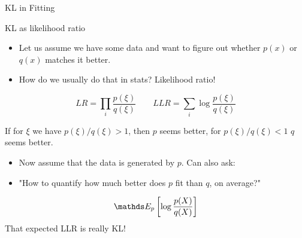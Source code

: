 \documentclass[11pt,compress,t,notes=noshow, xcolor=table]{beamer}
\begin{document}
\begin{vbframe} {KL in Fitting}
\framebreak



\end{vbframe}

\begin{vbframe}{KL as likelihood ratio}

\begin{itemize}
\item Let us assume we have some data and want to figure out whether $p(x)$ or $q(x)$ matches it better.
\item How do we usually do that in stats? Likelihood ratio! 
\end{itemize}

$$ LR = \prod_i \frac{p(\xi)}{q(\xi)} \qquad LLR = \sum_i \log \frac{p(\xi)}{q(\xi)} $$
  
If for $\xi$ we have $p(\xi)/q(\xi)>1$, then $p$ seems better, for $p(\xi)/q(\xi) < 1$ $q$ seems better. \\
\begin{itemize}
    \item Now assume that the data is generated by $p$. Can also ask:
    \item "How to quantify how much better does $p$ fit than $q$, on average?"
\end{itemize}
$$ \E_p \left[\log \frac{p(X)}{q(X)}\right] $$
That expected LLR is really KL!

\end{vbframe}


\end{document}
